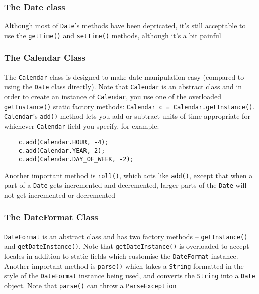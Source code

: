 \subsubsection{The Date class}
Although most of \verb#Date#'s methods have been depricated, it's still 
acceptable to use the \verb#getTime()# and \verb#setTime()# methods, although 
it's a bit painful

\subsubsection{The Calendar Class}
The \verb#Calendar# class is designed to make date manipulation easy (compared to 
using the \verb#Date# class directly). Note that \verb#Calendar# is an abstract 
class and in order to create an instance of \verb#Calendar#, you use one of the 
overloaded \verb#getInstance()# static factory methods:
\verb#Calendar c = Calendar.getInstance()#. \verb#Calendar#'s \verb#add()# 
method lets you add or subtract units of time appropriate for whichever 
\verb#Calendar# field you specify, for example:
\begin{verbatim}
    c.add(Calendar.HOUR, -4);
    c.add(Calendar.YEAR, 2);
    c.add(Calendar.DAY_OF_WEEK, -2);
\end{verbatim}
Another important method is \verb#roll()#, which acts like \verb#add()#, except 
that when a part of a \verb#Date# gets incremented and decremented, larger 
parts of the \verb#Date# will not get incremented or decremented

\subsubsection{The DateFormat Class}
\verb#DateFormat# is an abstract class and has two factory methods -- 
\verb#getInstance()# and \verb#getDateInstance()#. Note that 
\verb#getDateInstance()# is overloaded to accept locales in addition to static 
fields which customise the \verb#DateFormat# instance. Another important method 
is \verb#parse()# which takes a \verb#String# formatted in the style of the 
\verb#DateFormat# instance being used, and converts the \verb#String# into a 
\verb#Date# object. Note that \verb#parse()# can throw a \verb#ParseException#

